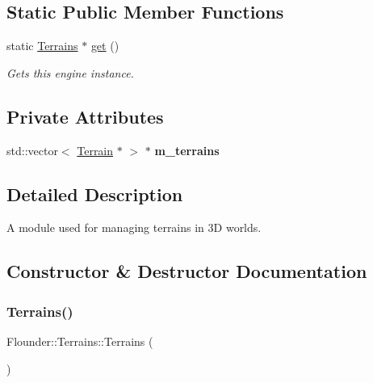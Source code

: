 \subsection*{Static Public Member Functions}
\begin{DoxyCompactItemize}
\item 
static \hyperlink{class_flounder_1_1_terrains}{Terrains} $\ast$ \hyperlink{class_flounder_1_1_terrains_a7b9b534b29b363a8592f7d0ea007be87}{get} ()
\begin{DoxyCompactList}\small\item\em Gets this engine instance. \end{DoxyCompactList}\end{DoxyCompactItemize}
\subsection*{Private Attributes}
\begin{DoxyCompactItemize}
\item 
\mbox{\label{class_flounder_1_1_terrains_aab944ab1bbfc4c123710beaabda3ea5e}} 
std\+::vector$<$ \hyperlink{class_flounder_1_1_terrain}{Terrain} $\ast$ $>$ $\ast$ {\bfseries m\+\_\+terrains}
\end{DoxyCompactItemize}


\subsection{Detailed Description}
A module used for managing terrains in 3D worlds. 



\subsection{Constructor \& Destructor Documentation}
\mbox{\label{class_flounder_1_1_terrains_a9b29646989e2c0888b29f501aad6a3cf}} 
\subsubsection{\texorpdfstring{Terrains()}{Terrains()}}
{\footnotesize\ttfamily Flounder\+::\+Terrains\+::\+Terrains (\begin{DoxyParamCaption}{ }\end{DoxyParamCaption})}



